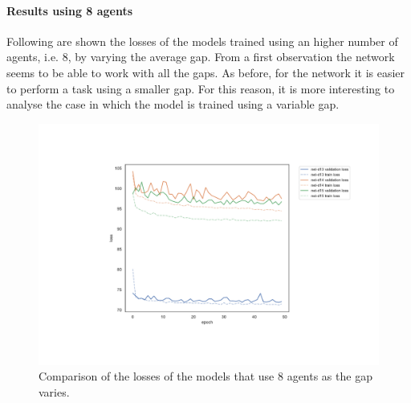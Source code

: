 \paragraph*{Results using 8 agents}
Following are shown the losses of the models trained using an higher number of 
agents, i.e. 8, by varying the average gap.
From a first observation the network seems to be able to work with all the gaps.
As before, for the network it is easier to perform a task using a smaller gap.
For this reason, it is more interesting to analyse the case in which the model 
is trained using a variable gap.
\begin{figure}[!htb]
	\centering
	\includegraphics[width=.75\textwidth]{contents/images/task1-extension/loss-distributed-n8@}%
	\caption[Comparison of the losses of the models that use $8$ 
	agents.]{Comparison of the losses of the models that use $8$ agents as 
	the gap varies.}
	\label{fig:distlossn8}
\end{figure}

